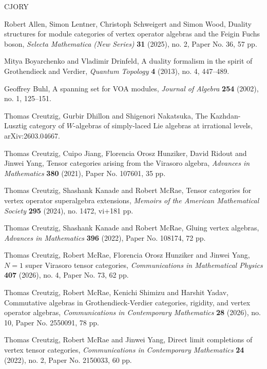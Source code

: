 \documentclass[11pt, reqno]{amsart}
\theoremstyle{definition}\newtheorem{defi}[thm]{Definition}
\theoremstyle{definition}\newtheorem{rem}[thm]{Remark}
\theoremstyle{definition}\newtheorem{exam}[thm]{Example}
\theoremstyle{definition}\newtheorem{assum}[thm]{Assumption}
\begin{document}
\begin{thebibliography}{CJORY}

Robert Allen, Simon Lentner, Christoph Schweigert and Simon Wood, Duality structures for module categories of vertex operator algebras and the Feigin Fuchs boson, \textit{Selecta Mathematica (New Series)} \textbf{31} (2025), no. 2, Paper No. 36, 57 pp.

Mitya Boyarchenko and Vladimir Drinfeld, A duality formalism in the spirit of Grothendieck and Verdier, \textit{Quantum Topology} \textbf{4} (2013), no. 4, 447--489.

Geoffrey Buhl, A spanning set for VOA modules, \textit{Journal of Algebra} \textbf{254} (2002), no. 1, 125--151.

Thomas Creutzig, Gurbir Dhillon and Shigenori Nakatsuka,
The Kazhdan-Lusztig category of $W$-algebras of simply-laced Lie algebras at irrational levels, arXiv:2603.04667.

Thomas Creutzig, Cuipo Jiang, Florencia Orosz Hunziker, David Ridout and Jinwei Yang, Tensor categories arising from the Virasoro algebra, \textit{Advances in Mathematics} \textbf{380} (2021), Paper No. 107601, 35 pp.

Thomas Creutzig, Shashank Kanade and Robert McRae, Tensor categories for vertex operator superalgebra extensions, \textit{Memoirs of the American Mathematical Society} \textbf{295} (2024), no. 1472, vi+181 pp.

Thomas Creutzig, Shashank Kanade and Robert McRae, Gluing vertex algebras, \textit{Advances in Mathematics} \textbf{396} (2022), Paper No. 108174, 72 pp.

 Thomas Creutzig, Robert McRae, Florencia Orosz Hunziker and Jinwei Yang, $N=1$ super Virasoro tensor categories, \textit{Communications in Mathematical Physics} \textbf{407} (2026), no. 4, Paper No. 73, 62 pp.

Thomas Creutzig, Robert McRae, Kenichi Shimizu and Harshit Yadav, Commutative algebras in Grothendieck-Verdier categories, rigidity, and vertex operator algebras, \textit{Communications in Contemporary Mathematics} \textbf{28} (2026), no. 10, Paper No. 2550091, 78 pp. 

Thomas Creutzig, Robert McRae and Jinwei Yang, Direct limit completions of vertex tensor categories, \textit{Communications in Contemporary Mathematics} \textbf{24} (2022), no. 2, Paper No. 2150033, 60 pp.


\end{thebibliography}
\end{document}
